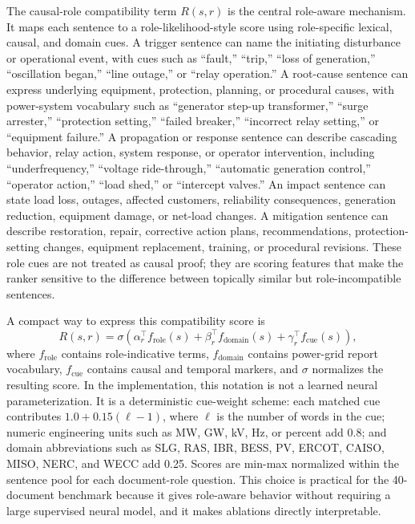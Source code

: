 \documentclass{article}
\begin{document}
The causal-role compatibility term $R(s,r)$ is the central role-aware mechanism. It maps each sentence to a role-likelihood-style score using role-specific lexical, causal, and domain cues. A trigger sentence can name the initiating disturbance or operational event, with cues such as ``fault,'' ``trip,'' ``loss of generation,'' ``oscillation began,'' ``line outage,'' or ``relay operation.'' A root-cause sentence can express underlying equipment, protection, planning, or procedural causes, with power-system vocabulary such as ``generator step-up transformer,'' ``surge arrester,'' ``protection setting,'' ``failed breaker,'' ``incorrect relay setting,'' or ``equipment failure.'' A propagation or response sentence can describe cascading behavior, relay action, system response, or operator intervention, including ``underfrequency,'' ``voltage ride-through,'' ``automatic generation control,'' ``operator action,'' ``load shed,'' or ``intercept valves.'' An impact sentence can state load loss, outages, affected customers, reliability consequences, generation reduction, equipment damage, or net-load changes. A mitigation sentence can describe restoration, repair, corrective action plans, recommendations, protection-setting changes, equipment replacement, training, or procedural revisions. These role cues are not treated as causal proof; they are scoring features that make the ranker sensitive to the difference between topically similar but role-incompatible sentences.

A compact way to express this compatibility score is
\begin{equation}
R(s,r)=
\sigma\left(
\alpha_r^\top f_{\mathrm{role}}(s)
+
\beta_r^\top f_{\mathrm{domain}}(s)
+
\gamma_r^\top f_{\mathrm{cue}}(s)
\right),
\label{eq:role}
\end{equation}
where $f_{\mathrm{role}}$ contains role-indicative terms, $f_{\mathrm{domain}}$ contains power-grid report vocabulary, $f_{\mathrm{cue}}$ contains causal and temporal markers, and $\sigma$ normalizes the resulting score. In the implementation, this notation is not a learned neural parameterization. It is a deterministic cue-weight scheme: each matched cue contributes $1.0+0.15(\ell-1)$, where $\ell$ is the number of words in the cue; numeric engineering units such as MW, GW, kV, Hz, or percent add 0.8; and domain abbreviations such as SLG, RAS, IBR, BESS, PV, ERCOT, CAISO, MISO, NERC, and WECC add 0.25. Scores are min-max normalized within the sentence pool for each document-role question. This choice is practical for the 40-document benchmark because it gives role-aware behavior without requiring a large supervised neural model, and it makes ablations directly interpretable.
\end{document}
